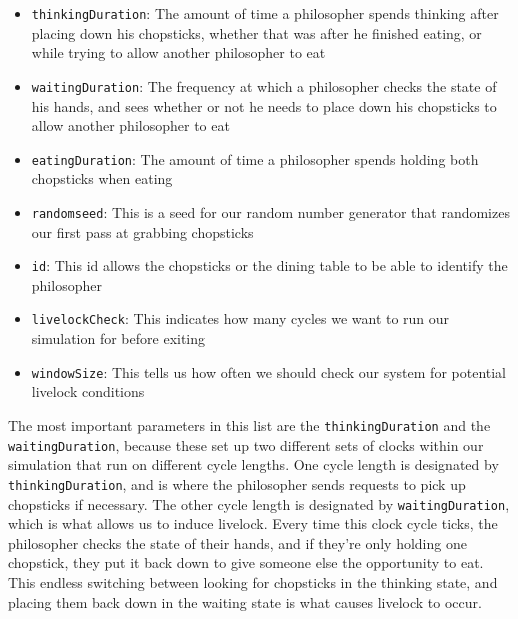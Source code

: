 \documentclass{article}
\begin{document}
\begin{itemize}
    \item \texttt{thinkingDuration}: The amount of time a philosopher spends thinking after placing down his chopsticks, whether that was after he finished eating, or while trying to allow another philosopher to eat
    \item \texttt{waitingDuration}: The frequency at which a philosopher checks the state of his hands, and sees whether or not he needs to place down his chopsticks to allow another philosopher to eat
    \item \texttt{eatingDuration}: The amount of time a philosopher spends holding both chopsticks when eating
    \item \texttt{randomseed}: This is a seed for our random number generator that randomizes our first pass at grabbing chopsticks
    \item \texttt{id}: This id allows the chopsticks or the dining table to be able to identify the philosopher
    \item \texttt{livelockCheck}: This indicates how many cycles we want to run our simulation for before exiting
    \item \texttt{windowSize}: This tells us how often we should check our system for potential livelock conditions
\end{itemize}

The most important parameters in this list are the \texttt{thinkingDuration} and the \texttt{waitingDuration}, because these set up two different sets of 
clocks within our simulation that run on different cycle lengths.  One cycle length is designated by \texttt{thinkingDuration}, and is where the 
philosopher sends requests to pick up chopsticks if necessary.  The other cycle length is designated by \texttt{waitingDuration}, which is what 
allows us to induce livelock.  Every time this clock cycle ticks, the philosopher checks the state of their hands, and if they’re only 
holding one chopstick, they put it back down to give someone else the opportunity to eat. This endless switching between looking for 
chopsticks in the thinking state, and placing them back down in the waiting state is what causes livelock to occur. \newline
\end{document}
